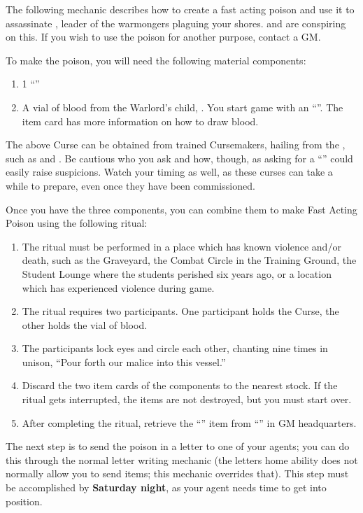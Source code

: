 \documentclass[green]{GL2020}
\begin{document}
\name{\gAssassinateWarlord{}}

The following mechanic describes how to create a fast acting poison and use it to assassinate \cLoud{\full}, leader of the \pShip{} warmongers plaguing your shores. \cEvil{\full} and \cDiplomat{\full} are conspiring on this. If you wish to use the poison for another purpose, contact a GM.

To make the poison, you will need the following material components:
\begin{enumerate}
  \item 1 ``\iSlowActingPoison{}''
  \item A vial of blood from the Warlord’s child, \cWarlordDaughter{\full}. You start game with an ``\iGlassVial{}''. The item card has more information on how to draw blood.
\end{enumerate}

The above Curse can be obtained from trained Cursemakers, hailing from the \pFarm{}, such as \cPrince{\full} and \cCurse{\full}. Be cautious who you ask and how, though, as asking for a ``\iSlowActingPoison{}'' could easily raise suspicions. Watch your timing as well, as these curses can take a while to prepare, even once they have been commissioned.

Once you have the three components, you can combine them to make Fast Acting Poison using the following ritual:
\begin{enumerate}
  \item The ritual must be performed in a place which has known violence and/or death, such as the Graveyard, the Combat Circle in the Training Ground, the Student Lounge where the students perished six years ago, or a location which has experienced violence during game.
  \item The ritual requires two participants. One participant holds the Curse, the other holds the vial of blood.
  \item The participants lock eyes and circle each other, chanting nine times in unison, “Pour forth our malice into this vessel.”
  \item Discard the two item cards of the components to the nearest stock. If the ritual gets interrupted, the items are not destroyed, but you must start over.
  \item After completing the ritual, retrieve the ``\iFastActingPoison{}'' item from ``\sSignP{}'' in GM headquarters.
\end{enumerate}

The next step is to send the poison in a letter to one of your \pShip{} agents; you can do this through the normal letter writing mechanic (the letters home ability does not normally allow you to send items; this mechanic overrides that). This step must be accomplished by \textbf{Saturday night}, as your agent needs time to get into position. 
\end{document}
